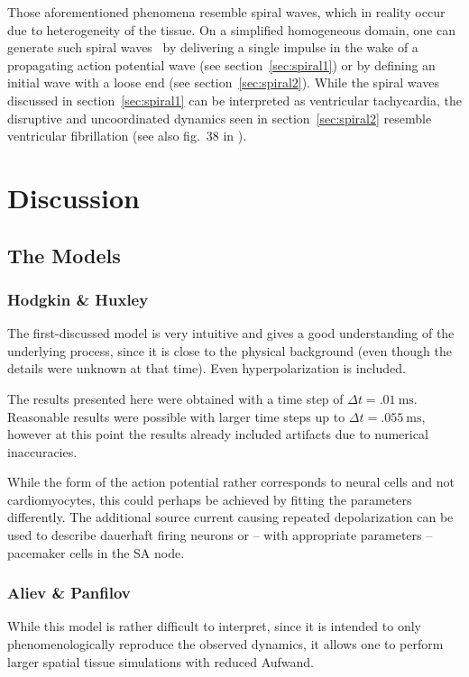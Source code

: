 Those aforementioned phenomena resemble spiral waves, which in reality occur
due to heterogeneity of the tissue. On a simplified homogeneous domain, one can
generate such spiral waves \eg~by delivering a single impulse in the wake of a
propagating action potential wave (see section~\ref{sec:spiral1}) or by
defining an initial wave with a loose end (see section~\ref{sec:spiral2}).
While the spiral waves discussed in section~\ref{sec:spiral1} can be
interpreted as ventricular tachycardia, the disruptive and uncoordinated
dynamics seen in section~\ref{sec:spiral2} resemble ventricular fibrillation
(see also fig.~38 in \cite{Cherry2008}).


\section{Discussion}
\subsection{The Models}
\subsubsection{Hodgkin \& Huxley}
The first-discussed model is very intuitive and gives a good understanding of
the underlying process, since it is close to the physical background (even
though the details were unknown at that time). Even hyperpolarization is
included.

The results presented here were obtained with a time step of
$\Delta{t}=\SI{.01}{\milli\second}$. Reasonable results were possible with
larger time steps up to $\Delta{t}=\SI{.055}{\milli\second}$, however at this
point the results already included artifacts due to numerical inaccuracies.

While the form of the action potential rather corresponds to neural cells and
not cardiomyocytes, this could perhaps be achieved by fitting the parameters
differently. The additional source current causing repeated depolarization
can be used to describe dauerhaft firing neurons or -- with
appropriate parameters -- pacemaker cells in the SA node.

\subsubsection{Aliev \& Panfilov}
While this model is rather difficult to interpret, since it is intended to
only phenomenologically reproduce the observed dynamics, it allows one to
perform larger spatial tissue simulations with reduced Aufwand.

